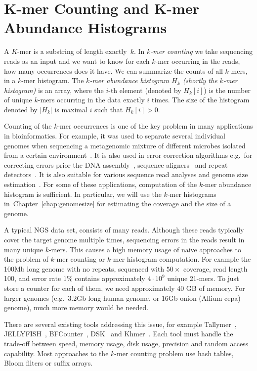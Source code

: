 \chapter[K-mer Counting]{K-mer Counting and K-mer Abundance Histograms}

A $K$-mer is a substring of length exactly~$k$. In \emph{$k$-mer counting} we take sequencing reads as an input and we want to know for each $k$-mer occurring in the reads, how many occurrences does it have. We can summarize the counts of all $k$-mers, in a $k$-mer histogram.
The \emph{$k$-mer abundance histogram $H_k$ (shortly the $k$-mer histogram)} is an array, where the $i$-th element (denoted by $H_k[i]$) is the number of unique $k$-mers occurring in the data exactly $i$ times. The size of the histogram denoted by $|H_k|$ is maximal $i$ such that $H_k[i] > 0$.

Counting of the $k$-mer occurrences is one of the key problem in many applications in bioinformatics.
For example, it was used to separate several individual
genomes when sequencing a metagenomic mixture of different microbes isolated from a certain environment~\cite{Wu2011, Wang2012}.
It is also used in error correction algorithms e.g.\ for correcting errors prior the DNA assembly~\cite{Pevzner2001}, sequence aligners~\cite{edgar2004muscle} and repeat detectors~\cite{caponnetto2013efficiency}.
It is also suitable for various sequence read analyses and genome size estimation~\cite{covest, williams, waterman}.
For some of these applications, computation of the $k$-mer abundance histogram is sufficient.
In particular, we will use the $k$-mer histograms in~Chapter~\ref{chap:genomesize} for estimating the coverage and the size of a genome.

A typical NGS data set, consists of many reads. Although these reads typically cover the target genome multiple times, sequencing errors in the reads result in many unique $k$-mers.
This causes a high memory usage of naive approaches to the problem of $k$-mer counting or $k$-mer histogram computation.
For example the 100Mb long genome with no repeats, sequenced with $50\times$ coverage, read length 100, and error rate $1\%$ contains approximately $4\cdot 10^9$ unique 21-mers. To just store a counter for each of them, we need approximately $40$ GB of memory. For larger genomes (e.g.\ 3.2Gb long human genome, or 16Gb onion (Allium cepa) genome), much more memory would be needed.

There are several existing tools addressing this issue, for example Tallymer~\cite{tallymer}, JELLYFISH~\cite{jellyfish}, BFCounter~\cite{bfcounter}, DSK~\cite{dsk} and Khmer~\cite{khmer}. Each tool must handle the trade-off between speed, memory usage, disk usage, precision and random access capability. Most approaches to the $k$-mer counting problem use hash tables, Bloom filters or suffix arrays.

